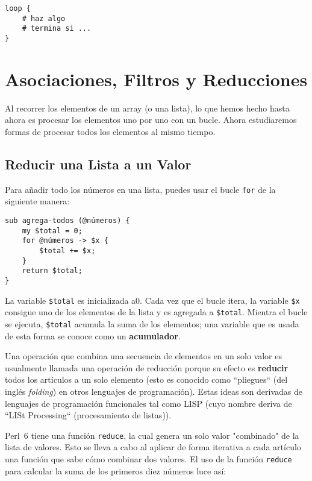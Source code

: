 \begin{lstlisting}
loop {
    # haz algo
    # termina si ...
}
\end{lstlisting}
%


\section{Asociaciones, Filtros y Reducciones}
\label{map_filter}

Al recorrer los elementos de un array (o una lista), lo que hemos
hecho hasta ahora es procesar los elementos uno por uno con un 
bucle. Ahora estudiaremos formas de procesar todos los elementos
al mismo tiempo.

\subsection{Reducir una Lista a un Valor}

Para añadir todo los números en una lista, puedes usar 
el bucle {\tt for} de la siguiente manera:

\begin{lstlisting}
sub agrega-todos (@números) {
    my $total = 0;
    for @números -> $x {
        $total += $x;
    }
    return $total;
}
\end{lstlisting}
%
La variable {\tt \$total} es inicializada a0. Cada vez que el
bucle itera, la variable {\tt \$x} consigue uno de los elementos
de la lista y es agregada a {\tt \$total}. Mientra el bucle se ejecuta,
{\tt \$total} acumula la suma de los elementos; una variable que 
es usada de esta forma se conoce como un {\bf acumulador}.

Una operación que combina una secuencia de elementos en un
solo valor es usualmente llamada una operación de reducción porque
su efecto es {\bf reducir} todos los artículos a un solo elemento
(esto es conocido como ``pliegues`` (del inglés \emph{folding})
en otros lenguajes de programación). Estas ideas son derivadas de
lenguajes de programación funcionales tal como LISP (cuyo nombre
deriva de ``LISt Processing`` (procesamiento de listas)).

Perl~6 tiene una función {\tt reduce}, la cual genera un solo
valor "combinado" de la lista de valores. Esto se lleva a cabo 
al aplicar de forma iterativa a cada artículo una
función que sabe cómo combinar dos valores. El uso de la función
{\tt reduce} para calcular la suma de los primeros 
diez números luce así:

